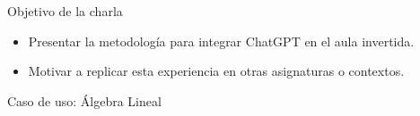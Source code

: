 \begin{frame}
    \begin{block}{Objetivo de la charla}
        \begin{itemize}[leftmargin=*]
            \item Presentar la metodología para integrar ChatGPT en el aula invertida.
            \item Motivar a replicar esta experiencia en otras asignaturas o contextos.
        \end{itemize}
    \end{block}

    \vspace{0.3cm}
    \pause
    \begin{block}{}\centering
        Caso de uso: Álgebra Lineal
    \end{block}
\end{frame}


